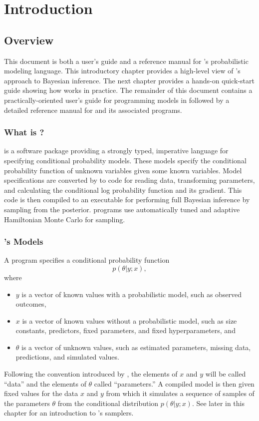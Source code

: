 \part{Introduction}


\chapter{Overview}

This document is both a user's guide and a reference manual for
\Stan's probabilistic modeling language.  This introductory chapter
provides a high-level view of \Stan's approach to Bayesian inference.
The next chapter provides a hands-on quick-start guide showing how
\Stan works in practice.  The remainder of this document contains a
practically-oriented user's guide for programming models in \Stan
followed by a detailed reference manual for \Stan and its associated
programs.

\section{What is \Stan?}

\Stan is a software package providing a strongly typed, imperative
language for specifying conditional probability models.  These models
specify the conditional probability function of unknown variables
given some known variables.  Model specifications are converted by
\Stan to \Cpp code for reading data, transforming parameters, and
calculating the conditional log probability function and its gradient.
This \Cpp code is then compiled to an executable for performing full
Bayesian inference by sampling from the posterior.  \Stan programs use
automatically tuned and adaptive Hamiltonian Monte Carlo for sampling.


\section{\Stan's Models}

A \Stan program specifies a conditional probability function
\[
p(\theta|y;x),
\]
where
%
\begin{itemize}
\item $y$ is a vector of known values with a probabilistic model,
  such as observed outcomes,
\item $x$ is a vector of known values without a probabilistic
  model, such as size constants, predictors, fixed
  parameters, and fixed hyperparameters, and
\item $\theta$ is a vector of unknown values, such as estimated
  parameters, missing data, predictions, and simulated values.
\end{itemize}
%
Following the convention introduced by \BUGS, the elements of $x$ and
$y$ will be called ``data'' and the elements of $\theta$ called
``parameters.''  A compiled \Stan model is then given fixed values for
the data $x$ and $y$ from which it simulates a sequence of samples of
the parameters $\theta$ from the conditional distribution
$p(\theta|y;x)$.  See  later in this
chapter for an introduction to \Stan's samplers.

